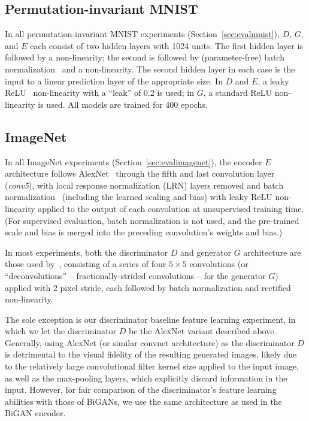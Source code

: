 \documentclass{article}
\newcommand{\refsec}[1]{Section~\ref{sec:#1}}
\newcommand{\lblsec}[1]{\label{sec:#1}}
\begin{document}
\begin{appendices}
\subsection{Permutation-invariant MNIST}
\lblsec{mnistarch}
In all permutation-invariant MNIST experiments (\refsec{evalmnist}),
$D$, $G$, and $E$ each consist of two hidden layers with 1024 units.
The first hidden layer is followed by a non-linearity;
the second is followed by (parameter-free) batch normalization~\citep{batchnorm} and a non-linearity.
The second hidden layer in each case is the input to a linear prediction layer of the appropriate size.
In $D$ and $E$, a leaky ReLU~\citep{leakyrelu} non-linearity with a ``leak'' of 0.2 is used;
in $G$, a standard ReLU non-linearity is used.
All models are trained for 400 epochs.

\subsection{ImageNet}
\lblsec{imagenetarch}
In all ImageNet experiments (\refsec{evalimagenet}), the encoder $E$ architecture follows AlexNet~\citep{supervision}
through the fifth and last convolution layer (\textit{conv5}),
with local response normalization (LRN) layers removed and batch normalization~\citep{batchnorm}
(including the learned scaling and bias)
with leaky ReLU non-linearity applied to the output of each convolution at unsupervised training time.
(For supervised evaluation, batch normalization is not used, and the pre-trained scale and bias is merged into the preceding convolution's weights and bias.)

In most experiments, both the discriminator $D$ and generator $G$ architecture
are those used by~\citet{dcgan},
consisting of a series of four $5\times5$ convolutions
(or ``deconvolutions'' -- fractionally-strided convolutions -- for the generator $G$)
applied with 2 pixel stride,
each followed by batch normalization and rectified non-linearity.

The sole exception is our discriminator baseline feature learning experiment,
in which we let the discriminator $D$ be the AlexNet variant described above.
Generally, using AlexNet (or similar convnet architecture) as the discriminator $D$
is detrimental to the visual fidelity of the resulting generated images,
likely due to the relatively large convolutional filter kernel size applied to the input image,
as well as the max-pooling layers, which explicitly discard information in the input.
However, for fair comparison of the discriminator's feature learning abilities with those of BiGANs,
we use the same architecture as used in the BiGAN encoder.


\end{appendices}
\end{document}
